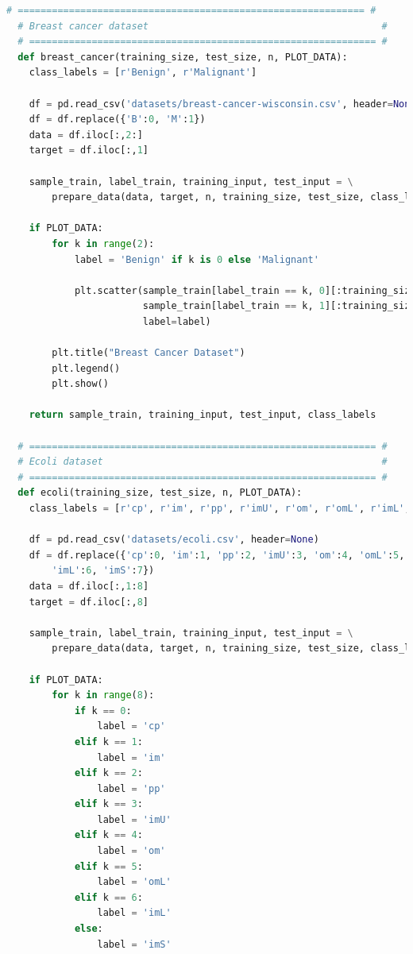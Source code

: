 \documentclass{article}
\begin{document}
\begin{lstlisting}[language=Python]
  # ============================================================= #
  # Breast cancer dataset                                         #
  # ============================================================= #
  def breast_cancer(training_size, test_size, n, PLOT_DATA):
    class_labels = [r'Benign', r'Malignant']

    df = pd.read_csv('datasets/breast-cancer-wisconsin.csv', header=None)
    df = df.replace({'B':0, 'M':1})
    data = df.iloc[:,2:]
    target = df.iloc[:,1]

    sample_train, label_train, training_input, test_input = \
        prepare_data(data, target, n, training_size, test_size, class_labels)

    if PLOT_DATA:
        for k in range(2):
            label = 'Benign' if k is 0 else 'Malignant'

            plt.scatter(sample_train[label_train == k, 0][:training_size],
                        sample_train[label_train == k, 1][:training_size],
                        label=label)

        plt.title("Breast Cancer Dataset")
        plt.legend()
        plt.show()

    return sample_train, training_input, test_input, class_labels

  # ============================================================= #
  # Ecoli dataset                                                 #
  # ============================================================= #
  def ecoli(training_size, test_size, n, PLOT_DATA):
    class_labels = [r'cp', r'im', r'pp', r'imU', r'om', r'omL', r'imL', r'imS']

    df = pd.read_csv('datasets/ecoli.csv', header=None)
    df = df.replace({'cp':0, 'im':1, 'pp':2, 'imU':3, 'om':4, 'omL':5, \
        'imL':6, 'imS':7})
    data = df.iloc[:,1:8]
    target = df.iloc[:,8]

    sample_train, label_train, training_input, test_input = \
        prepare_data(data, target, n, training_size, test_size, class_labels)

    if PLOT_DATA:
        for k in range(8):
            if k == 0:
                label = 'cp'
            elif k == 1:
                label = 'im'
            elif k == 2:
                label = 'pp'
            elif k == 3:
                label = 'imU'
            elif k == 4:
                label = 'om'
            elif k == 5:
                label = 'omL'
            elif k == 6:
                label = 'imL'
            else:
                label = 'imS'


\end{lstlisting}
\end{document}
